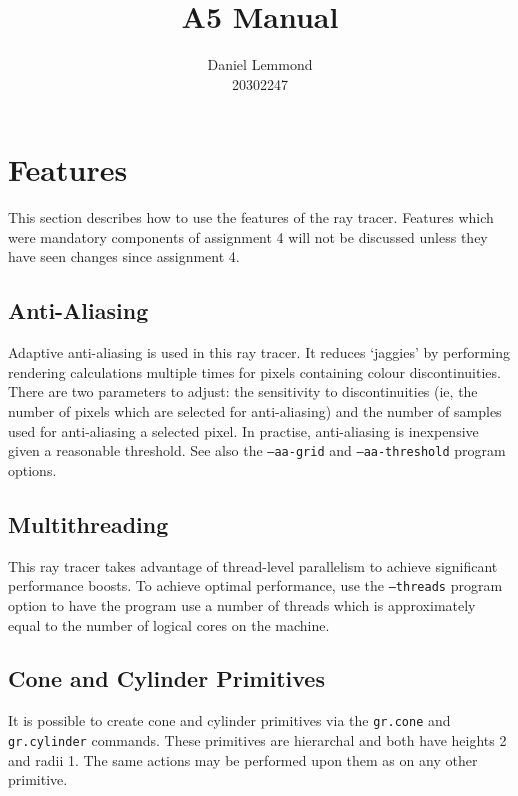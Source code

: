 \documentclass{article}
\begin{document}
\title{A5 Manual}
\author{Daniel Lemmond\\
20302247}

\maketitle

\tableofcontents

\section{Features}
\label{using_the_features}

This section describes how to use the features of the ray tracer. Features which
were mandatory components of assignment 4 will not be discussed unless they have
seen changes since assignment 4.

\subsection{Anti-Aliasing}
\label{anti_aliasing}

Adaptive anti-aliasing is used in this ray tracer. It reduces `jaggies' by
performing rendering calculations multiple times for pixels containing colour
discontinuities. There are two parameters to adjust: the sensitivity to
discontinuities (ie, the number of pixels which are selected for anti-aliasing)
and the number of samples used for anti-aliasing a selected pixel. In practise,
anti-aliasing is inexpensive given a reasonable threshold. See also the
{\tt --aa-grid} and {\tt --aa-threshold} program options.

\subsection{Multithreading}
\label{multithreading}

This ray tracer takes advantage of thread-level parallelism to achieve
significant performance boosts. To achieve optimal performance, use the
{\tt --threads} program option to have the program use a number of threads which is
approximately equal to the number of logical cores on the machine.

\subsection{Cone and Cylinder Primitives}
\label{primitives}

It is possible to create cone and cylinder primitives via the {\tt gr.cone} and
{\tt gr.cylinder} commands. These primitives are hierarchal and both have heights
2 and radii 1. The same actions may be performed
upon them as on any other primitive.
\end{document}
